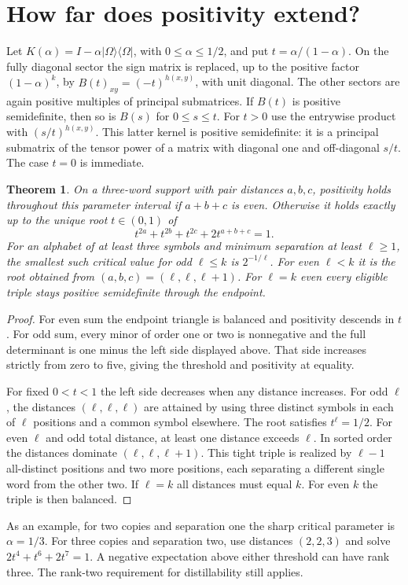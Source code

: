 \documentclass[11pt]{article}
\newtheorem{theorem}{Theorem}
\begin{document}
\section{How far does positivity extend?}
Let $K(\alpha)=I-\alpha|\Omega\rangle\langle\Omega|$, with $0\le\alpha\le1/2$, and put $t=\alpha/(1-\alpha)$. On the fully diagonal sector the sign matrix is replaced, up to the positive factor $(1-\alpha)^k$, by $B(t)_{xy}=(-t)^{h(x,y)}$, with unit diagonal. The other sectors are again positive multiples of principal submatrices. If $B(t)$ is positive semidefinite, then so is $B(s)$ for $0\le s\le t$. For $t>0$ use the entrywise product with $(s/t)^{h(x,y)}$. This latter kernel is positive semidefinite: it is a principal submatrix of the tensor power of a matrix with diagonal one and off-diagonal $s/t$. The case $t=0$ is immediate.

\begin{theorem}
On a three-word support with pair distances $a,b,c$, positivity holds throughout this parameter interval if $a+b+c$ is even. Otherwise it holds exactly up to the unique root $t\in(0,1)$ of
\[
t^{2a}+t^{2b}+t^{2c}+2t^{a+b+c}=1.
\]
For an alphabet of at least three symbols and minimum separation at least $\ell\ge1$, the smallest such critical value for odd $\ell\le k$ is $2^{-1/\ell}$. For even $\ell<k$ it is the root obtained from $(a,b,c)=(\ell,\ell,\ell+1)$. For $\ell=k$ even every eligible triple stays positive semidefinite through the endpoint.
\end{theorem}
\begin{proof}
For even sum the endpoint triangle is balanced and positivity descends in $t$. For odd sum, every minor of order one or two is nonnegative and the full determinant is one minus the left side displayed above. That side increases strictly from zero to five, giving the threshold and positivity at equality.

For fixed $0<t<1$ the left side decreases when any distance increases. For odd $\ell$, the distances $(\ell,\ell,\ell)$ are attained by using three distinct symbols in each of $\ell$ positions and a common symbol elsewhere. The root satisfies $t^\ell=1/2$. For even $\ell$ and odd total distance, at least one distance exceeds $\ell$. In sorted order the distances dominate $(\ell,\ell,\ell+1)$. This tight triple is realized by $\ell-1$ all-distinct positions and two more positions, each separating a different single word from the other two. If $\ell=k$ all distances must equal $k$. For even $k$ the triple is then balanced.
\end{proof}
As an example, for two copies and separation one the sharp critical parameter is $\alpha=1/3$. For three copies and separation two, use distances $(2,2,3)$ and solve $2t^4+t^6+2t^7=1$. A negative expectation above either threshold can have rank three. The rank-two requirement for distillability still applies.
\end{document}
